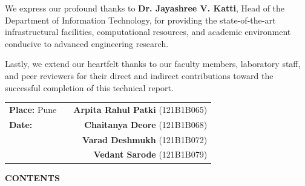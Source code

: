 \documentclass[12pt,a4paper]{report}
\begin{document}
\noindent We express our profound thanks to \textbf{Dr. Jayashree V. Katti}, Head of the Department of Information Technology, for providing the state-of-the-art infrastructural facilities, computational resources, and academic environment conducive to advanced engineering research.

\noindent Lastly, we extend our heartfelt thanks to our faculty members, laboratory staff, and peer reviewers for their direct and indirect contributions toward the successful completion of this technical report.

\vspace{1.8cm}
\noindent
\begin{tabularx}{\textwidth}{l X r}
\textbf{Place:} Pune & & \textbf{Arpita Rahul Patki} (121B1B065) \\
\textbf{Date:}  & & \textbf{Chaitanya Deore} (121B1B068) \\
& & \textbf{Varad Deshmukh} (121B1B072) \\
& & \textbf{Vedant Sarode} (121B1B079)
\end{tabularx}

\newpage
{}
\setcounter{page}{1}

\begin{center}
    {\fontsize{14pt}{18pt}\selectfont \textbf{CONTENTS}}\\[0.4cm]
\end{center}

\tableofcontents
\newpage
\listoffigures
\vspace{0.8cm}
\listoftables
\end{document}
